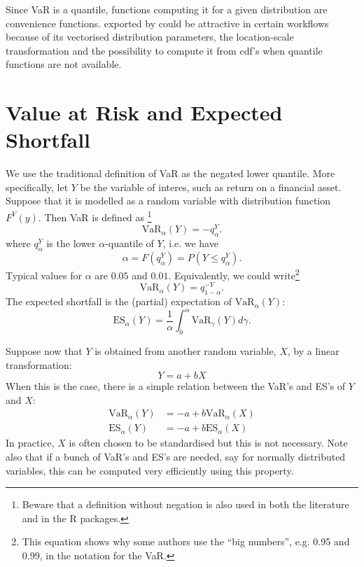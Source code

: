 \documentclass[nojss,article]{jss}
\newcommand{\VaR}[2][\alpha]{\text{VaR}_{#1}(#2)}
\newcommand{\ES}[2][\alpha]{\text{ES}_{#1}(#2)}
\begin{document}
Since VaR is a quantile, functions computing it for a given
distribution are convenience functions.  exported by
 could be attractive in certain workflows because of
its vectorised distribution parameters, the location-scale
transformation and the possibility to compute it from cdf's
when quantile functions are not available.


\section{Value at Risk and Expected Shortfall}

We use the traditional definition of VaR as the negated lower quantile.  More specifically,
let $Y$ be the variable of interes, such as return on a financial asset. Suppose that it is
modelled as a random variable with distribution function $F^{Y}(y)$. Then VaR is defined as%
\footnote{Beware that a definition without negation is also used in both the literature and
  in the R packages.}
\begin{equation*}
  \VaR{Y}  = - q_{\alpha}^{Y}
  .
\end{equation*}
where $q_{\alpha}^{Y}$ is the lower $\alpha$-quantile of $Y$, i.e. we have
\begin{equation*}
  \alpha = F(q_{\alpha}^{Y}) = P(Y \le q_{\alpha}^{Y})
  .
\end{equation*}
Typical values for $\alpha$ are $0.05$ and $0.01$.
Equivalently, we could write\footnote{This equation shows why some authors use the ``big numbers'', e.g. 0.95 and 0.99, in the notation for the VaR.}
\begin{equation*}
  \VaR{Y}  = q_{1-\alpha}^{-Y}
  .
\end{equation*}
The expected shortfall is the (partial) expectation of $\VaR{Y}$:
\begin{equation*}
  \ES{Y} = \frac{1}{\alpha}\int_{0}^{\alpha}\VaR[\gamma]{Y} d\gamma
  .
\end{equation*}

Suppose now that $Y$ is obtained from another random variable, $X$, by a linear transformation:
\begin{equation*}
  Y = a + bX
\end{equation*}
When this is the case, there is a simple relation between the VaR's and ES's of $Y$ and $X$:
\begin{align*}
  \VaR{Y} &= -a + b \VaR{X} \\
   \ES{Y} &= -a + b \ES{X}
\end{align*}
In practice, $X$ is often chosen to be standardised but this is not necessary. Note also that
if a bunch of VaR's and ES's are needed, say for normally distributed variables, this can be
computed very efficiently using this property.
\end{document}
